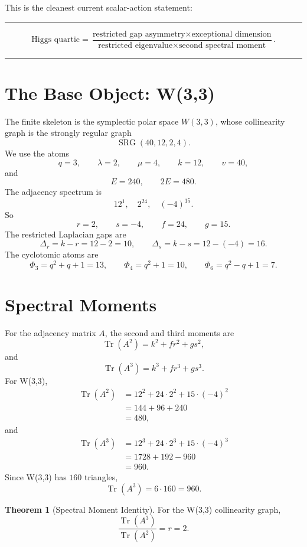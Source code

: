 \documentclass[11pt]{article}
\theoremstyle{definition}
\newtheorem{theorem}{Theorem}
\newcommand{\Tr}{\operatorname{Tr}}
\newcommand{\Deltar}{\Delta_r}
\newcommand{\Deltas}{\Delta_s}
\newcommand{\PhiThree}{\Phi_3}
\newcommand{\PhiFour}{\Phi_4}
\newcommand{\PhiSix}{\Phi_6}
\newenvironment{keybox}{%
  \begin{center}\begin{minipage}{0.94\linewidth}\color{darkblue}\hrule\vspace{0.6em}
}{%
  \vspace{0.6em}\hrule\end{minipage}\end{center}
}
\begin{document}
This is the cleanest current scalar-action statement:

\begin{keybox}
\[
\boxed{
\text{Higgs quartic} =
\frac{\text{restricted gap asymmetry}\times\text{exceptional dimension}}
{\text{restricted eigenvalue}\times\text{second spectral moment}}.
}
\]
\end{keybox}

\section{The Base Object: W(3,3)}

The finite skeleton is the symplectic polar space \(W(3,3)\), whose collinearity graph is the strongly regular graph
\[
  \operatorname{SRG}(40,12,2,4).
\]
We use the atoms
\[
  q=3,\qquad \lambda=2,\qquad \mu=4,\qquad k=12,
  \qquad v=40,
\]
and
\[
  E=240,\qquad 2E=480.
\]
The adjacency spectrum is
\[
  12^1,\quad 2^{24},\quad (-4)^{15}.
\]
So
\[
  r=2,
  \qquad s=-4,
  \qquad f=24,
  \qquad g=15.
\]
The restricted Laplacian gaps are
\[
  \Deltar = k-r=12-2=10,
  \qquad
  \Deltas = k-s=12-(-4)=16.
\]
The cyclotomic atoms are
\[
  \PhiThree=q^2+q+1=13,
  \qquad
  \PhiFour=q^2+1=10,
  \qquad
  \PhiSix=q^2-q+1=7.
\]

\section{Spectral Moments}

For the adjacency matrix \(A\), the second and third moments are
\[
  \Tr(A^2)=k^2+fr^2+gs^2,
\]
and
\[
  \Tr(A^3)=k^3+fr^3+gs^3.
\]
For W(3,3),
\[
\begin{aligned}
\Tr(A^2)
  &= 12^2 + 24\cdot 2^2 + 15\cdot (-4)^2 \\
  &= 144 + 96 + 240 \\
  &= 480,
\end{aligned}
\]
and
\[
\begin{aligned}
\Tr(A^3)
  &= 12^3 + 24\cdot 2^3 + 15\cdot (-4)^3 \\
  &= 1728 + 192 - 960 \\
  &= 960.
\end{aligned}
\]
Since W(3,3) has \(160\) triangles,
\[
  \Tr(A^3)=6\cdot 160=960.
\]

\begin{theorem}[Spectral Moment Identity]
For the W(3,3) collinearity graph,
\[
  \boxed{\displaystyle \frac{\Tr(A^3)}{\Tr(A^2)} = r = 2.}
\]
\end{theorem}
\end{document}
